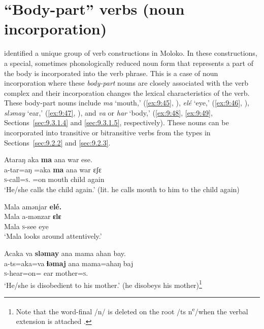 \section{“Body-part” verbs (noun incorporation)}\label{sec:9.3}
\hypertarget{RefHeading1212761525720847}{}
\citet{FriesenMamalis2008} identified a unique group of verb constructions in Moloko. In these constructions, a special, sometimes phonologically reduced noun form that represents a part of the body is incorporated into the verb phrase.  This is a case of noun incorporation where these \textit{body-part} nouns are closely associated with the verb complex and their incorporation changes the lexical characteristics of the verb. These body-part nouns include \textit{ma} ‘mouth,’ (\ref{ex:9:45}, ), \textit{elé} ‘eye,’ (\ref{ex:9:46}, ), \textit{sləmay} ‘ear,’ (\ref{ex:9:47}, ), and \textit{va} or \textit{har} ‘body,’ (\ref{ex:9:48}, \ref{ex:9:49}, Sections~\ref{sec:9.3.1.4} and \ref{sec:9.3.1.5}, respectively). These nouns can be incorporated into transitive or bitransitive verbs from the types in Sections~\ref{sec:9.2.2} and \ref{sec:9.2.3}.

\ea \label{ex:9:45}
Ataraŋ  aka  \textbf{ma}  ana  war  ese.\\
\gll  a-tar=aŋ     =aka   \textbf{ma}  ana  war  ɛʃɛ\\
      \textsc{s}-call=\textsc{s}.{\IO}  =on  mouth  {\DAT} child  again\\
\glt  ‘He/she calls the child again.’ (lit. he calls mouth to him to the child again)
\z

\ea \label{ex:9:46}
Mala  amənjar  \textbf{elé.}\\
\gll  Mala   a-mənzar   \textbf{ɛlɛ}\\
      Mala   \textsc{s}-see    eye\\
\glt  ‘Mala looks around attentively.’ 
\z

\ea \label{ex:9:47}
Acaka  va  \textbf{sləmay}  ana  mama  ahan  bay.\\
\gll  a-ts=aka=va  \textbf{ɬəmaj}   ana  mama=ahaŋ    baj\\
      \textsc{s}-hear=on={\PRF}  ear  {\DAT} mother=\textsc{s}.{\POSS}  {\NEG}\\
\glt  ‘He/she is disobedient to his mother.’ (he disobeys his mother)\footnote{Note that the word-final /n/ is deleted on the root /ts n\textsuperscript{e}/when the verbal extension is attached .} 
\z

